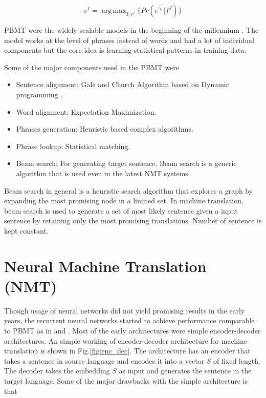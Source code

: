 \documentclass[a4paper]{article}
\DeclareMathOperator*{\argmax}{arg\,max}
\begin{document}
\begin{equation*}
  e^{I} = \argmax_{I,e^{I}} \Bigg\{Pr(e^{\prime i^\prime} | f^J) \Bigg\}
\end{equation*}


PBMT  were  the widely  scalable models  in  the  beginning  of  the  millennium
\cite{koehn2003statistical}. The model works  at the level of phrases instead of
words and  had  a lot of individual components  but  the  core idea is  learning
statistical patterns in training data.

Some of the major components used in the PBMT were


\begin{itemize}
  \item Sentence  alignment:   Gale   and  Church  Algorithm  based  on  Dynamic
        programming \cite{lewis1994sequential}.
  \item Word alignment: Expectation Maximization.
  \item Phrases generation: Heuristic based complex algorithms.
  \item Phrase lookup: Statistical matching.
  \item Beam search:  For  generating target sentence.  Beam search is a generic
        algorithm that is used even in the latest NMT systems.
\end{itemize}


Beam search in general is a heuristic search  algorithm that explores a graph by
expanding the most promising node in a limited set. In machine translation, beam
search is used to generate  a set of most likely sentence given a input sentence
by retaining  only the most promising  translations. Number of sentence  is kept
constant.


\section{Neural Machine Translation (NMT)}

Though usage of  neural networks did  not  yield  promising results in the early
years, the recurrent neural networks started to  achieve  performance comparable
to       PBMT       as       in       \cite{kalchbrenner2013recurrent}       and
\cite{hermann2013multilingual}. Most  of  the  early architectures  were  simple
encoder-decoder architectures. An simple working of encoder-decoder architecture
for machine translation is shown in Fig.\ref{fig:enc_dec}. The architecture has
an encoder that takes a sentence in source language and encodes it into a vector
$S$ of fixed length. The decoder takes the embedding $S$ as  input and generates
the sentence in the target language. Some of the major drawbacks with the simple
architecture is that
\end{document}
